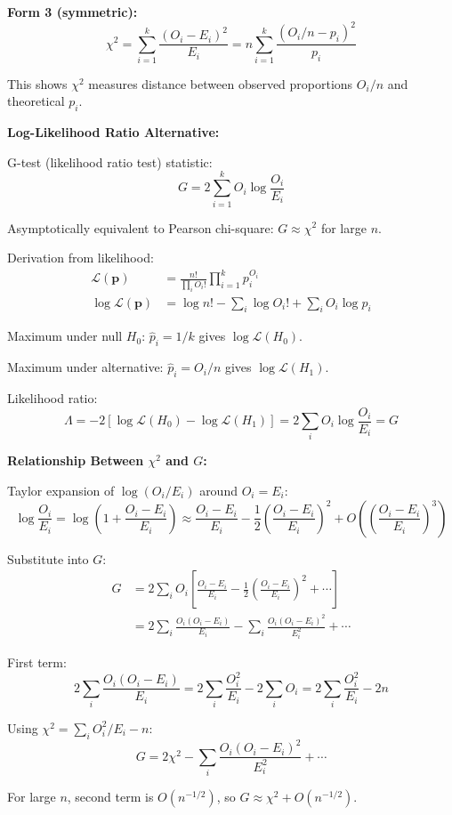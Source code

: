 \documentclass[12pt]{article}
\begin{document}
\begin{explanation}
\textbf{Form 3 (symmetric):}
\[
\chi^2 = \sum_{i=1}^k \frac{(O_i - E_i)^2}{E_i} = n\sum_{i=1}^k \frac{(O_i/n - p_i)^2}{p_i}
\]

This shows $\chi^2$ measures distance between observed proportions $O_i/n$ and theoretical $p_i$.

\textbf{Log-Likelihood Ratio Alternative:}

G-test (likelihood ratio test) statistic:
\[
G = 2\sum_{i=1}^k O_i \log\frac{O_i}{E_i}
\]

Asymptotically equivalent to Pearson chi-square: $G \approx \chi^2$ for large $n$.

Derivation from likelihood:
\begin{align*}
\mathcal{L}(\mathbf{p}) &= \frac{n!}{\prod_i O_i!}\prod_{i=1}^k p_i^{O_i} \\
\log \mathcal{L}(\mathbf{p}) &= \log n! - \sum_i \log O_i! + \sum_i O_i\log p_i
\end{align*}

Maximum under null $H_0$: $\hat{p}_i = 1/k$ gives $\log \mathcal{L}(H_0)$.

Maximum under alternative: $\hat{p}_i = O_i/n$ gives $\log \mathcal{L}(H_1)$.

Likelihood ratio:
\[
\Lambda = -2[\log \mathcal{L}(H_0) - \log \mathcal{L}(H_1)] = 2\sum_i O_i\log\frac{O_i}{E_i} = G
\]

\textbf{Relationship Between $\chi^2$ and $G$:}

Taylor expansion of $\log(O_i/E_i)$ around $O_i = E_i$:
\[
\log\frac{O_i}{E_i} = \log\left(1 + \frac{O_i - E_i}{E_i}\right) \approx \frac{O_i - E_i}{E_i} - \frac{1}{2}\left(\frac{O_i - E_i}{E_i}\right)^2 + O\left(\left(\frac{O_i - E_i}{E_i}\right)^3\right)
\]

Substitute into $G$:
\begin{align*}
G &= 2\sum_i O_i\left[\frac{O_i - E_i}{E_i} - \frac{1}{2}\left(\frac{O_i - E_i}{E_i}\right)^2 + \cdots\right] \\
&= 2\sum_i \frac{O_i(O_i - E_i)}{E_i} - \sum_i \frac{O_i(O_i - E_i)^2}{E_i^2} + \cdots
\end{align*}

First term:
\[
2\sum_i \frac{O_i(O_i - E_i)}{E_i} = 2\sum_i \frac{O_i^2}{E_i} - 2\sum_i O_i = 2\sum_i \frac{O_i^2}{E_i} - 2n
\]

Using $\chi^2 = \sum_i O_i^2/E_i - n$:
\[
G = 2\chi^2 - \sum_i \frac{O_i(O_i - E_i)^2}{E_i^2} + \cdots
\]

For large $n$, second term is $O(n^{-1/2})$, so $G \approx \chi^2 + O(n^{-1/2})$.


\end{explanation}
\end{document}
